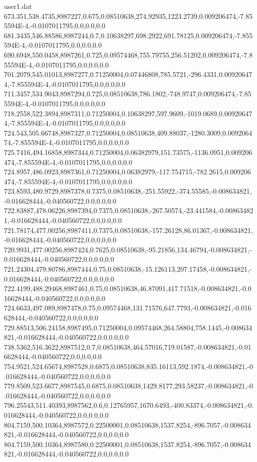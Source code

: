 \begin{filecontents}{user1.dat}
673.351,538.4735,8987227,0.675,0.08510638,274.92935,1223.2739,0.009206474,-7.855594E-4,-0.0107011795,0.0,0.0,0.0
681.3435,546.88586,8987244,0.7,0.10638297,698.2922,691.78125,0.009206474,-7.855594E-4,-0.0107011795,0.0,0.0,0.0
690.6948,550.0458,8987261,0.725,0.09574468,755.79755,256.51202,0.009206474,-7.855594E-4,-0.0107011795,0.0,0.0,0.0
701.2079,545.01013,8987277,0.71250004,0.07446808,785.5721,-296.4331,0.009206474,-7.855594E-4,-0.0107011795,0.0,0.0,0.0
711.3457,534.9043,8987294,0.725,0.08510638,786.1802,-748.9747,0.009206474,-7.855594E-4,-0.0107011795,0.0,0.0,0.0
718.2558,522.3894,8987311,0.71250004,0.10638297,597.9609,-1019.0689,0.009206474,-7.855594E-4,-0.0107011795,0.0,0.0,0.0
724.543,505.66748,8987327,0.71250004,0.08510638,409.88037,-1280.3009,0.009206474,-7.855594E-4,-0.0107011795,0.0,0.0,0.0
725.7416,494.16858,8987344,0.71250004,0.06382979,151.73575,-1136.0951,0.009206474,-7.855594E-4,-0.0107011795,0.0,0.0,0.0
724.8957,486.0923,8987361,0.71250004,0.06382979,-117.754715,-782.2615,0.009206474,-7.855594E-4,-0.0107011795,0.0,0.0,0.0
723.8593,480.9729,8987378,0.7375,0.08510638,-251.55922,-374.55585,-0.008634821,-0.016628444,-0.040560722,0.0,0.0,0.0
722.83887,478.06226,8987394,0.7375,0.08510638,-267.50574,-23.441584,-0.008634821,-0.016628444,-0.040560722,0.0,0.0,0.0
721.78174,477.00256,8987411,0.7375,0.08510638,-157.26128,86.01367,-0.008634821,-0.016628444,-0.040560722,0.0,0.0,0.0
720.9931,477.00256,8987424,0.7625,0.08510638,-95.21856,134.46794,-0.008634821,-0.016628444,-0.040560722,0.0,0.0,0.0
721.24304,479.80786,8987444,0.75,0.08510638,-15.126113,207.17458,-0.008634821,-0.016628444,-0.040560722,0.0,0.0,0.0
722.4199,488.29468,8987461,0.75,0.08510638,46.87091,417.71518,-0.008634821,-0.016628444,-0.040560722,0.0,0.0,0.0
724.6633,497.089,8987478,0.75,0.09574468,131.71576,647.7793,-0.008634821,-0.016628444,-0.040560722,0.0,0.0,0.0
729.88513,506.24158,8987495,0.71250004,0.09574468,264.58804,758.1445,-0.008634821,-0.016628444,-0.040560722,0.0,0.0,0.0
738.5362,516.3622,8987512,0.7,0.08510638,464.57016,719.01587,-0.008634821,-0.016628444,-0.040560722,0.0,0.0,0.0
754.9521,524.65674,8987528,0.6875,0.08510638,835.16113,592.1874,-0.008634821,-0.016628444,-0.040560722,0.0,0.0,0.0
779.8509,523.6677,8987545,0.6875,0.08510638,1429.8177,293.58237,-0.008634821,-0.016628444,-0.040560722,0.0,0.0,0.0
796.25543,511.40393,8987562,0.6,0.12765957,1670.6493,-400.83374,-0.008634821,-0.016628444,-0.040560722,0.0,0.0,0.0
804.7159,500.10364,8987572,0.22500001,0.08510638,1537.8254,-896.7057,-0.008634821,-0.016628444,-0.040560722,0.0,0.0,0.0
804.7159,500.10364,8987580,0.22500001,0.08510638,1537.8254,-896.7057,-0.008634821,-0.016628444,-0.040560722,0.0,0.0,0.0

\end{filecontents}
